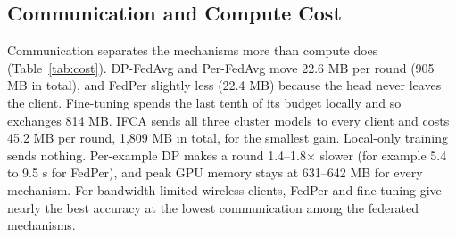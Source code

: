 \subsection{Communication and Compute Cost}
Communication separates the mechanisms more than compute does (Table~\ref{tab:cost}). DP-FedAvg and Per-FedAvg move
22.6 MB per round (905 MB in total), and FedPer slightly less (22.4 MB) because the head never leaves the client.
Fine-tuning spends the last tenth of its budget locally and so exchanges 814 MB. IFCA sends all three cluster models
to every client and costs 45.2 MB per round, 1,809 MB in total, for the smallest gain. Local-only training sends
nothing. Per-example DP makes a round 1.4--1.8$\times$ slower (for example 5.4 to 9.5 s for FedPer), and peak GPU
memory stays at 631--642 MB for every mechanism. For bandwidth-limited wireless clients, FedPer and fine-tuning give
nearly the best accuracy at the lowest communication among the federated mechanisms.

\begin{table}[!t]
\caption{Cost per mechanism on CIFAR-10 at $\eps_0$ (20 clients; 32-bit parameters; DP overhead = seconds per
round with DP divided by seconds per round without DP).}
\label{tab:cost}
\centering
\footnotesize
{}
\end{table}

